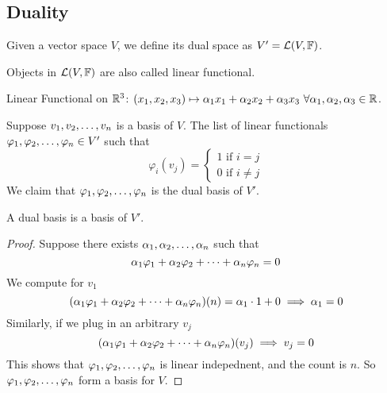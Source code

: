 \subsection{Duality}
\begin{definition}
    Given a vector space $V$, we define its dual space as $V' = \mathcal L(V,\mathbb F)$. 
\end{definition}
\begin{remark}
    Objects in $\mathcal L(V,\mathbb F)$ are also called linear functional.
\end{remark}
\begin{example}
    Linear Functional on $\mathbb R^3$: $(x_1, x_2, x_3) \mapsto \alpha_1 x_1 + \alpha_2 x_2 + \alpha_3 x_3 \ \forall \alpha_1, \alpha_2, \alpha_3 \in \mathbb R$.
\end{example}
\begin{definition}
    Suppose ${v}_1,{v}_2, \ldots, {v}_{n}$ is a basis of $V$. The list of linear functionals ${\varphi}_1,{\varphi}_2, \ldots, {\varphi}_{n} \in  V'$ such that \[\varphi_i(v_j) = \left\{ \begin{array}{cc}
         1 \text{ if } i = j \\
         0 \text{ if } i \neq j
    \end{array} \right.\] We claim that ${\varphi}_1,{\varphi}_2, \ldots, {\varphi}_{n}$ is the dual basis of $V'$.
\end{definition}
\begin{lemma}
    A dual basis is a basis of $V'$.
\end{lemma}
\begin{proof}
    Suppose there exists ${\alpha}_1,{\alpha}_2, \ldots, {\alpha}_{n}$ such that 
    \[ {\alpha}_1{\varphi}_1 + {\alpha}_2{\varphi}_2 + \cdots + {\alpha}_{n}{\varphi}_{n} = 0\]
    We compute for $v_1$
    \[ ({\alpha}_1{\varphi}_1 + {\alpha}_2{\varphi}_2 + \cdots + {\alpha}_{n}{\varphi}_{n})(n) = \alpha_1 \cdot 1 + 0 \implies \alpha_1 = 0\]
    Similarly, if we plug in an arbitrary $v_j$
    \[ ({\alpha}_1{\varphi}_1 + {\alpha}_2{\varphi}_2 + \cdots + {\alpha}_{n}{\varphi}_{n})(v_j) \implies v_j = 0\]
    This shows that ${\varphi}_1,{\varphi}_2, \ldots, {\varphi}_{n}$ is linear indepednent, and the count is $n$. So ${\varphi}_1,{\varphi}_2, \ldots, {\varphi}_{n}$ form a basis for $V$.
\end{proof}
